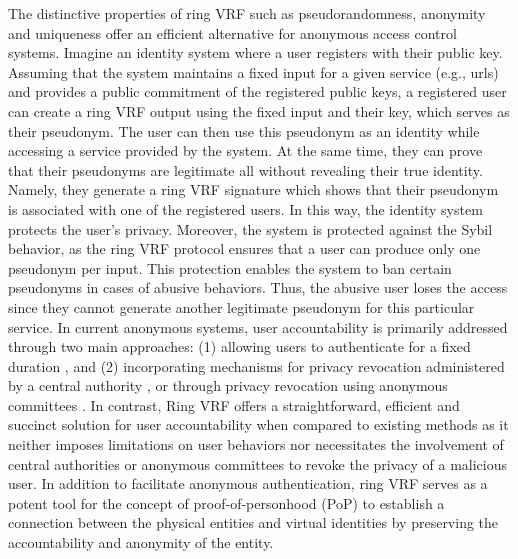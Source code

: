 The distinctive properties of ring VRF such as pseudorandomness, anonymity and uniqueness offer  an efficient alternative for anonymous access control systems. Imagine an identity system where a user registers with their public key. Assuming that the system maintains a fixed input for a given service (e.g., urls) and provides a public commitment of the registered public keys, a registered user  can create a ring VRF output using the fixed input and their key, which serves as their pseudonym.  The user can then use this pseudonym as an identity while accessing a service provided by the system. At the same time, they can prove that their pseudonyms  are  legitimate  all without revealing their true identity. Namely, they generate a ring VRF signature which shows that their pseudonym is associated with one of the registered users. In this way, the identity system protects the user's  privacy. Moreover, the  system is protected against the Sybil behavior, as the ring VRF protocol ensures that a user can produce only one pseudonym per input. This protection enables the system to ban certain pseudonyms in cases of abusive behaviors. Thus, the abusive user loses the access since they cannot generate  another legitimate pseudonym for this particular service.
In current anonymous systems, user accountability is primarily addressed through two main approaches: (1) allowing users to authenticate for a fixed duration \cite{limited_authentication1,limited_authentication2,limited_authentication3}, and (2) incorporating mechanisms for privacy revocation administered by a central authority \cite{revocation1,revocation2,revocation3,revocation4}, or through privacy revocation using anonymous committees \cite{anonymous-committee1,anonymous-committee2}.
In contrast, Ring VRF offers a straightforward, efficient and succinct solution for user accountability when compared to existing methods as it neither imposes limitations on user behaviors nor necessitates the involvement of central authorities or anonymous committees to revoke the privacy of a malicious user.
In addition to facilitate anonymous authentication, ring VRF  serves as a potent tool for the concept of proof-of-personhood (PoP) \cite{pop2008,pop2017,pop2020} to establish a connection between the physical entities and virtual identities by preserving the accountability and anonymity of the entity. 


